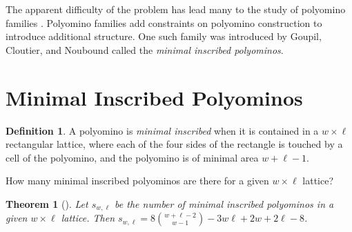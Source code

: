 \documentclass[12pt]{article}
\newtheorem{theorem}{Theorem}
\theoremstyle{plain}
\theoremstyle{definition}
\theoremstyle{remark}
\theoremstyle{definition}
\newtheorem{definition}{Definition}[section]
\newcommand{\cell}[4]{\filldraw[gray!40] ( #1 , #2 ) rectangle ( #3 , #4 ); \draw[thick] ( #1 , #2 ) rectangle ( #3 , #4 );}
\begin{document}
The apparent difficulty of the problem has lead many to the study of polyomino families \cite{Gessel99onthe, BARCUCCI200562, Lin_1988}. Polyomino families add constraints on polyomino construction to introduce additional structure. One such family was introduced by Goupil, Cloutier, and Noubound \cite{10.1016/j.dam.2010.08.011} called the \textit{minimal inscribed polyominos}.

\section{Minimal Inscribed Polyominos}
\label{sec:minimals}

\begin{definition}\label{def:minimalinscribedpolyomino}
    A polyomino is \textit{minimal inscribed} when it is contained in a $w \times \ell$ rectangular lattice, where each of the four sides of the rectangle is touched by a cell of the polyomino, and the polyomino is of minimal area $w+ \ell -1$.
\end{definition}

\begin{center}
    \label{fig:ex minimally inscribed poly}
\end{center}

How many minimal inscribed polyominos are there for a given $w \times \ell$ lattice? 

\begin{theorem}[\cite{10.1016/j.dam.2010.08.011}]\label{thm:minimalsformula}
Let $s_{w,\ell}$ be the number of minimal inscribed polyominos in a given $w \times \ell$ lattice. Then $s_{w,\ell}=8\binom{w+\ell-2}{w-1} -3w\ell + 2w +2\ell-8$.
\end{theorem}
\end{document}
